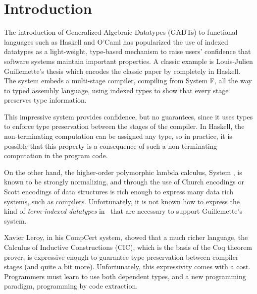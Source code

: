 \section{Introduction}
\label{sec:intro}


The introduction of Generalized Algebraic Datatypes (GADTs) to
functional languages such as Haskell and O'Caml has popularized
the use of indexed datatypes as a light-weight, type-based mechanism
to raise users' confidence that software systems maintain important properties.
A classic example is Louis-Julien Guillemette's thesis \cite{guillemetteThesis}
which encodes the classic paper by \citet{tal-toplas} completely
in Haskell. The system embeds a multi-stage compiler, compiling from System F,
all the way to typed assembly language, using indexed types to show that
every stage preserves type information.

This impressive system provides confidence, but no guarantees, since it uses
types to enforce type preservation between the stages of the compiler.
In Haskell, the non-terminating computation can be assigned any type,
so in practice, it is possible that this property is a consequence of
such a non-terminating computation in the program code.

On the other hand, the higher-order polymorphic lambda calculus, System \Fw,
is known to be strongly normalizing, and through the use of Church encodings
or Scott encodings of data structures is rich enough to express
many data rich systems, 
such as compilers. 
Unfortunately, it is not known how to express the kind of
\emph{term-indexed datatypes} in \Fw\ that are necessary to support
Guillemette's system.

Xavier Leroy, in his CompCert system\cite{Leroy-Compcert-CACM}, showed that
a much richer language, the Calculus of Inductive Constructions (CIC), which
is the basis of the Coq theorem prover, is expressive enough to guarantee
type preservation between compiler stages (and quite a bit more).
Unfortunately, this expressivity comes with a cost. Programmers must learn to
use both dependent types, and a new programming paradigm, programming by
code extraction.

